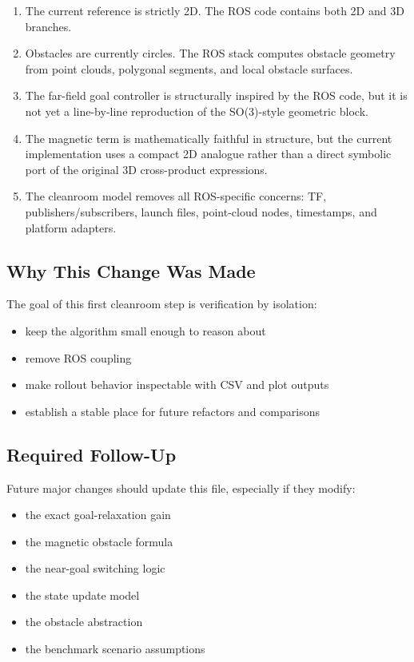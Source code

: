 \documentclass[11pt]{article}
\begin{document}
\begin{enumerate}[leftmargin=*]
  \item The current reference is strictly 2D. The ROS code contains both 2D and 3D branches.
  \item Obstacles are currently circles. The ROS stack computes obstacle geometry from point clouds, polygonal segments, and local obstacle surfaces.
  \item The far-field goal controller is structurally inspired by the ROS code, but it is not yet a line-by-line reproduction of the SO(3)-style geometric block.
  \item The magnetic term is mathematically faithful in structure, but the current implementation uses a compact 2D analogue rather than a direct symbolic port of the original 3D cross-product expressions.
  \item The cleanroom model removes all ROS-specific concerns: TF, publishers/subscribers, launch files, point-cloud nodes, timestamps, and platform adapters.
\end{enumerate}

\subsection*{Why This Change Was Made}

The goal of this first cleanroom step is verification by isolation:

\begin{itemize}[leftmargin=*]
  \item keep the algorithm small enough to reason about
  \item remove ROS coupling
  \item make rollout behavior inspectable with CSV and plot outputs
  \item establish a stable place for future refactors and comparisons
\end{itemize}

\subsection*{Required Follow-Up}

Future major changes should update this file, especially if they modify:

\begin{itemize}[leftmargin=*]
  \item the exact goal-relaxation gain
  \item the magnetic obstacle formula
  \item the near-goal switching logic
  \item the state update model
  \item the obstacle abstraction
  \item the benchmark scenario assumptions
\end{itemize}
\end{document}
